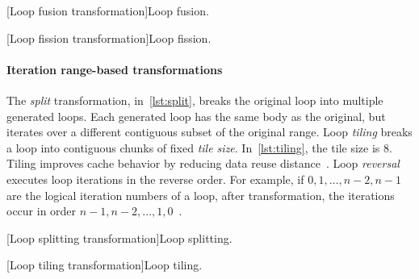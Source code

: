 \begin{center}
\begin{minipage}{\textwidth}
\captionsetup{type=lstlisting}
\begin{minipage}{.45\textwidth}
\captionsetup{type=lstlisting}
[Loop fusion transformation]{Loop fusion.}
\label{lst:fusion}
\end{minipage}\hfill%
\begin{minipage}{.45\textwidth}
[Loop fission transformation]{Loop fission.}
\label{lst:fission}
\end{minipage}
\end{minipage}
\end{center}

\paragraph*{Iteration range-based transformations}
The \emph{split} transformation,
in~\autoref{lst:split}, breaks the original loop into multiple generated loops.
Each generated loop has the same body as the original, but iterates over a different contiguous subset of the original range.
Loop \emph{tiling} breaks a loop into contiguous chunks of fixed \emph{tile size}.
In~\autoref{lst:tiling}, the tile size is 8.
Tiling improves cache behavior by reducing data reuse distance~\cite{bertolacci2018}.
Loop \emph{reversal} executes loop iterations in the reverse order.
For example, if \(0, 1,\ldots, n-2, n-1\) are the logical iteration numbers of a loop, after transformation, the iterations occur in order \(n-1, n-2,\ldots, 1, 0\)~\cite{openmp_api}.

\begin{center}
\begin{minipage}{\textwidth}
\captionsetup{type=lstlisting}
\begin{minipage}{.45\textwidth}
[Loop splitting transformation]{Loop splitting.}
\label{lst:split}
\end{minipage}\hfill%
\begin{minipage}{.45\textwidth}
[Loop tiling transformation]{Loop tiling.}
\label{lst:tiling}
\end{minipage}
\end{minipage}
\end{center}

